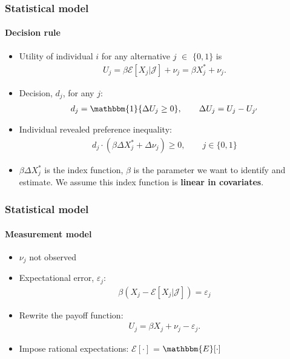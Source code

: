 \begin{frame}
\frametitle{Statistical model} \framesubtitle{Decision rule}

\begin{itemize}
\item Utility of individual $i$ for any alternative $j$ $\in$ $\{0,1\}$ is  
\begin{align*}
U_{j}=\beta\mathcal{E}[X_{j}|\mathcal{J}]+\nu_{j}=\beta X^{*}_{j} + \nu_{j}.
\end{align*}

\item Decision, $d_{j}$, for any $j$:  
\begin{align*}
d_{j} = \mathbbm{1}\{\Delta U_{j}\geq 0\},\qquad\Delta U_{j} =
U_{j}-U_{j^{\prime }}
\end{align*}

\item Individual revealed preference inequality:  
\begin{align*}
d_{j} \cdot (\beta\Delta X^{*}_{j}+\Delta\nu_{j})\geq 0, \qquad j \in \{0,1\}
\end{align*}

\item $\beta\Delta X^{*}_{j}$ is the index function, $\beta$ is the
parameter we want to identify and estimate. We assume this index function is 
\textbf{linear in covariates}.
\end{itemize}
\end{frame}


\begin{frame}
\frametitle{Statistical model} \framesubtitle{Measurement model}

\begin{itemize}
\item $\nu_{j}$ not observed 

\item Expectational error, $\varepsilon_{j}$:  
\begin{align*}
\beta(X_{j} - \mathcal{E}[X_{j}|\mathcal{J}] )= \varepsilon_{j}
\end{align*}

\item Rewrite the payoff function:  
\begin{align*}
U_{j} = \beta X_{j}+\nu_{j}-\varepsilon_{j}.
\end{align*}

\item Impose rational expectations: $\mathcal{E}[\cdot]$ = $%
\mathbbm{E}[\cdot]$
\end{itemize}
\end{frame}

